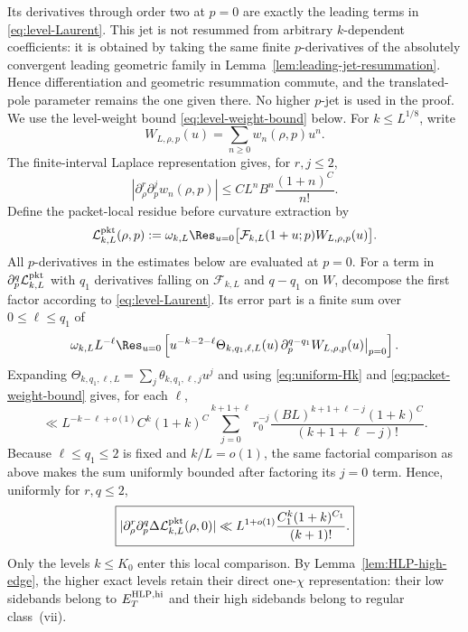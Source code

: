 Its derivatives through order two at $p=0$ are exactly the leading terms in
\eqref{eq:level-Laurent}. This jet is not resummed from arbitrary
$k$-dependent coefficients: it is obtained by taking the same finite
$p$-derivatives of the absolutely convergent leading geometric family in
Lemma~\ref{lem:leading-jet-resummation}. Hence differentiation and geometric
resummation commute, and the translated-pole parameter remains the one given
there. No higher $p$-jet is used in the proof.  We use the level-weight bound
\eqref{eq:level-weight-bound} below. For $k\le L^{1/8}$, write
\[
W_{L,\rho,p}(u)=\sum_{n\ge0}w_n(\rho,p)u^n.
\]
The finite-interval Laplace representation gives, for $r,j\le2$,
\begin{equation}
|\partial_\rho^r\partial_p^j w_n(\rho,p)|
\le C L^nB^n\frac{(1+n)^C}{n!}.
\label{eq:packet-weight-bound}
\end{equation}
Define the packet-local residue before curvature extraction by
\[
\mathcal L_{k,L}^{\rm pkt}(\rho,p)
:=\omega_{k,L}\Res_{u=0}
\bigl[\mathcal F_{k,L}(1+u;p)W_{L,\rho,p}(u)\bigr].
\]
All $p$-derivatives in the estimates below are evaluated at $p=0$. For a term
in $\partial_p^q\mathcal L_{k,L}^{\rm pkt}$ with $q_1$ derivatives falling on
$\mathcal F_{k,L}$ and $q-q_1$ on $W$, decompose the first factor according to
\eqref{eq:level-Laurent}. Its error part is a finite sum over
$0\le\ell\le q_1$ of
\[
\omega_{k,L}L^{-\ell}\Res_{u=0}
\left[u^{-k-2-\ell}\Theta_{k,q_1,\ell,L}(u)
\,\partial_p^{q-q_1}W_{L,\rho,p}(u)\big|_{p=0}\right].
\]
Expanding $\Theta_{k,q_1,\ell,L}=\sum_j\theta_{k,q_1,\ell,j}u^j$ and using
\eqref{eq:uniform-Hk} and \eqref{eq:packet-weight-bound} gives, for each
$\ell$,
\[
\ll L^{-k-\ell+o(1)}C^k(1+k)^C
\sum_{j=0}^{k+1+\ell}r_0^{-j}
\frac{(BL)^{k+1+\ell-j}(1+k)^C}
{(k+1+\ell-j)!}.
\]
Because $\ell\le q_1\le2$ is fixed and $k/L=o(1)$, the same factorial
comparison as above makes the sum uniformly bounded after factoring its $j=0$
term. Hence, uniformly for $r,q\le2$,
\begin{equation}
\boxed{
|\partial_\rho^r\partial_p^q\Delta\mathcal L_{k,L}^{\rm pkt}(\rho,0)|
\ll L^{1+o(1)}
\frac{C_1^k(1+k)^{C_1}}{(k+1)!}.
}
\label{eq:level-local-error}
\end{equation}
Only the levels $k\le K_0$ enter this local comparison. By
Lemma~\ref{lem:HLP-high-edge}, the higher exact levels retain their direct
one-$\chi$ representation: their low sidebands belong to
$E_T^{\rm HLP,hi}$ and their high sidebands belong to regular class~(vii).

